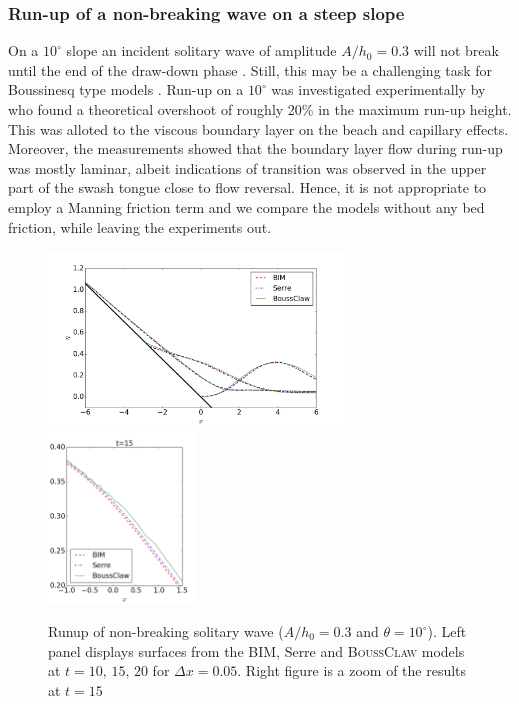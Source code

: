 \documentclass[review]{elsarticle}
\newcommand{\BoussClaw}{\textsc{BoussClaw} }
\begin{document}
\subsubsection{Run-up of a non-breaking wave on a steep slope}
\label{sec:10degrunup}
On a $10^\circ$ slope an incident solitary wave of amplitude $A/h_0=0.3$ will not break until the end of the draw-down phase \citep{Grilli:1997}.
Still, this may be a challenging task for Boussinesq type models \citep{Lovholt:2013a}. Run-up on a $10^\circ$ was investigated experimentally
by \citet{Pedersen:2013} who found a theoretical overshoot of roughly 20\% in the maximum run-up height. This was alloted to the viscous boundary layer on the beach and capillary effects. Moreover, the measurements showed that the boundary layer flow during run-up was mostly laminar, albeit indications of transition was observed in the upper part of the swash tongue close to flow reversal. Hence, it is not appropriate to employ a Manning friction term and we compare the models without any bed friction, while leaving the experiments out. 

\begin{figure}[!htb]
\centering
\includegraphics[height=4.6cm]{_fig/bim_serre_boussclaw_slope10}
\includegraphics[height=4.6cm]{_fig/bim_serre_boussclaw_slope10_zoom}
\caption{Runup of non-breaking solitary wave ($A/h_0=0.3$ and $\theta=10^\circ$). Left panel displays  surfaces from the BIM, Serre and \BoussClaw models at
	$t = 10,\,15,\,20$ for $\Delta x=0.05$. Right figure is a zoom of the results at $t=15$}
\label{fig:bim_serre_boussclaw_slope10}
\end{figure}
\end{document}
